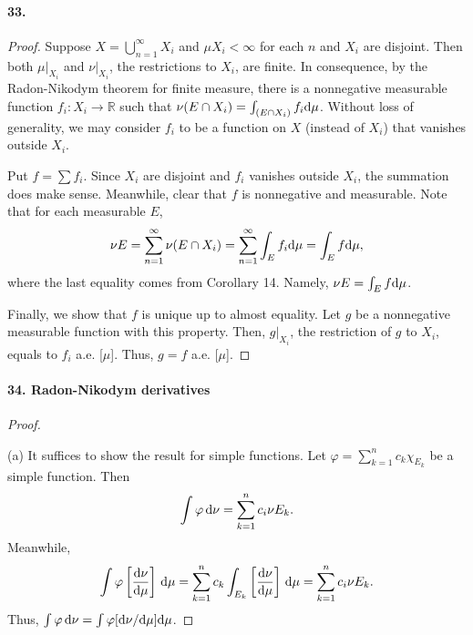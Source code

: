  \paragraph{33.}
  \begin{proof}
    Suppose $X=\bigcup_{n=1}^\infty X_i$ and $\mu X_i<\infty$ for each $n$
    and $X_i$ are disjoint. Then both $\mu|_{X_i}$ and $\nu|_{X_i}$, the 
    restrictions to $X_i$, are finite. In consequence, by the Radon-Nikodym
    theorem for finite measure, there is a nonnegative measurable function 
    $f_i:X_i\to\mathbb{R}$ such that $\nu(E\cap X_i)=\int_{(E\cap X_i)}
    f_i\mathrm{d}\mu$. Without loss of generality, we may consider $f_i$ to be a
    function on $X$ (instead of $X_i$) that vanishes outside $X_i$.\par
    Put $f=\sum f_i$. Since $X_i$ are disjoint and $f_i$ vanishes outside $X_i$,
    the summation does make sense. Meanwhile, clear that $f$ is nonnegative and
    measurable. Note that for each measurable $E$,
    \[
      \nu E=\sum_{n=1}^\infty\nu(E\cap X_i)=
      \sum_{n=1}^\infty\int_E f_i\mathrm{d}\mu=
      \int_E f\mathrm{d}\mu,
    \]
    where the last equality comes from Corollary 14. Namely, $\nu E=\int_E 
    f\mathrm{d}\mu$.\par
    Finally, we show that $f$ is unique up to almost equality. Let $g$ be a
    nonnegative measurable function with this property. Then, $g|_{X_i}$, the
    restriction of $g$ to $X_i$, equals to $f_i$ a.e. [$\mu$]. Thus, $g=f$
    a.e. [$\mu$].
  \end{proof}
  
  \paragraph{34. Radon-Nikodym derivatives}
  \begin{proof}
    $\,$\par
    (a) It suffices to show the result for simple functions. Let $\varphi=
    \sum_{k=1}^nc_k\chi_{E_k}$ be a simple function. Then
    \begin{equation*}
      \int \varphi\,\mathrm{d}\nu=\sum_{k=1}^nc_i\nu E_k.
    \end{equation*}
    Meanwhile,
    \[
      \int \varphi\left[\frac{\mathrm{d}\nu}{\mathrm{d}\mu}\right]\,\mathrm{d}\mu=
      \sum_{k=1}^n c_k\int_{E_k}\left[\frac{\mathrm{d}\nu}{\mathrm{d}\mu}\right]\,\mathrm{d}\mu=
      \sum_{k=1}^nc_i\nu E_k.
    \]
    Thus, $\int\varphi\,\mathrm{d}\nu=\int\varphi[\mathrm{d}\nu/\mathrm{d}\mu]\mathrm{d}\mu$.
  \end{proof}
  
